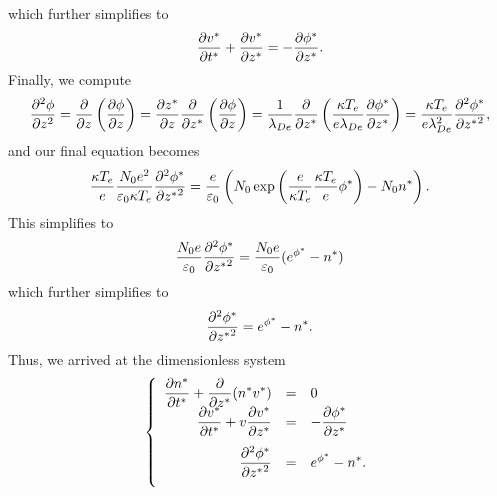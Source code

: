 \documentclass{article}
\begin{document}
which further simplifies to
\[
\frac{\partial v^*}{\partial t^*}+\frac{\partial v^*}{\partial z^*}=-\frac{\partial \phi^*}{\partial z^*}.
\]
Finally, we compute
\begin{align*}
\frac{\partial^{2} \phi} {\partial z^{2}}=\frac{\partial }{\partial z}\left(\frac{\partial \phi}{\partial z}\right)=\frac{\partial z^*}{\partial z}\frac{\partial }{\partial z^*}\left(\frac{\partial \phi}{\partial z}\right)=\frac{1}{\lambda_{De}}\frac{\partial }{\partial z^*}\left(\frac{\kappa T_e}{e\lambda_{De}}\frac{\partial \phi^*}{\partial z^*}\right)=\frac{\kappa T_e}{e\lambda_{De}^2}\frac{\partial^{2} \phi^*} {\partial {z^*}^{2}},
\end{align*}
and our final equation becomes 
\begin{align*}
\frac{\kappa T_e}{e}\frac{N_0 e^2}{\varepsilon_0 \kappa T_e}\frac{\partial^{2} \phi^*} {\partial {z^*}^{2}}=\frac{e}{\varepsilon_0}\left(N_0\exp\left(\frac{e}{\kappa T_e}\frac{\kappa T_e}{e}\phi^*\right)-N_0n^*\right).
\end{align*}
This simplifies to
\begin{align*}
\frac{N_0e}{\varepsilon_0}\frac{\partial^{2} \phi^*} {\partial {z^*}^{2}}=\frac{N_0e}{\varepsilon_0}(e^{\phi^*}-n^*)
\end{align*}
which further simplifies to
\[
\frac{\partial^{2} \phi^*} {\partial {z^*}^{2}}=e^{\phi^*}-n^*.
\]
Thus, we arrived at the dimensionless system
\[
\sys{
	\ds \pp{n^*}{t^*}+\pp{}{z^*}(n^*v^*)&=&0\\
	\vs\ds \pp{v^*}{t^*}+v\pp{v^*}{z^*}&=&\ds -\pp{\phi^*}{z^*}\\
	\vs \ds \ppn{2}{\phi^*}{{z^*}}&=&\ds e^{\phi^*}-n^*.
}
\]
\end{document}
